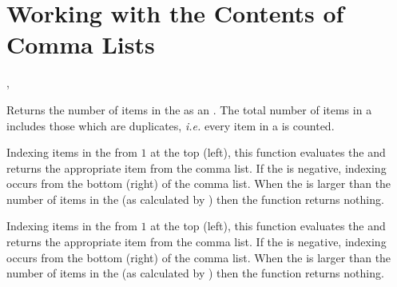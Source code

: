 \documentclass[oneside]{book}
\let\tn=\cs
\begin{document}
\section{Working with the Contents of Comma Lists}

\begin{function}{\ClistCount,\ClistVarCount}
\begin{syntax}
 
 
\end{syntax}
Returns the number of items in the 
as an . The total number of items
in a  includes those which are duplicates,
\emph{i.e.} every item in a  is counted.
\end{function}

\begin{function}{\ClistItem}
\begin{syntax}
  
\end{syntax}
Indexing items in the  from $1$ at the top (left), this
function evaluates the  and returns the
appropriate item from the comma list. If the
 is negative, indexing occurs from the
bottom (right) of the comma list. When the 
is larger than the number of items in the  (as
calculated by ) then the function returns nothing.
\end{function}
 
\begin{function}{\ClistVarItem}
\begin{syntax}
  
\end{syntax}
Indexing items in the  from $1$ at the top (left), this
function evaluates the  and returns the
appropriate item from the comma list. If the
 is negative, indexing occurs from the
bottom (right) of the comma list. When the 
is larger than the number of items in the  (as
calculated by ) then the function returns nothing.
\end{function}
 
\end{document}
